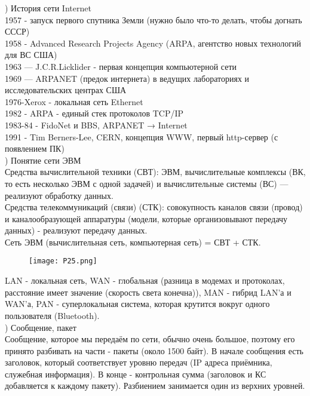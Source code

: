 ) История сети Internet \\
1957 - запуск первого спутника Земли (нужно было что-то делать, чтобы догнать СССР) \\
1958 - Advanced Research Projects Agency (ARPA, агентство новых технологий для ВС США)  \\
1963 — J.C.R.Licklider - первая концепция компьютерной сети \\
1969 — ARPANET (предок интернета) в ведущих лабораториях и исследовательских центрах США \\
1976-Xerox - локальная сеть Ethernet  \\
1982 - ARPA - единый стек протоколов TCP/IP \\ 
1983-84 - FidoNet и BBS, ARPANET → Internet \\
1991 - Tim Berners-Lee, CERN, концепция WWW, первый http-сервер (с появлением ПК) \\

) Понятие сети ЭВМ \\
Средства вычислительной техники (СВТ): ЭВМ, вычислительные комплексы (ВК, то есть несколько ЭВМ с одной задачей) и вычислительные системы (ВС) — реализуют обработку данных. \\
Средства телекоммуникаций (связи) (СТК): совокупность каналов связи (провод) и каналообразующей аппаратуры (модели, которые организовывают передачу данных) - реализуют передачу данных. \\
Сеть ЭВМ (вычислительная сеть, компьютерная сеть) = СВТ + СТК. 
\begin{figure}[H]
    \centering
    \texttt{[image: P25.png]}

\end{figure}
\noindent LAN - локальная сеть, WAN - глобальная (разница в модемах и протоколах, расстояние имеет значение (скорость света конечна)), MAN - гибрид LAN'а и WAN'а, PAN - суперлокальная система, которая крутится вокруг одного пользователя (Bluetooth). \\


) Сообщение, пакет \\
Сообщение, которое мы передаём по сети, обычно очень большое, поэтому его принято разбивать на части - пакеты (около 1500 байт). В начале сообщения есть заголовок, который соответствует уровню передач (IP адреса приёмника, служебная информация). В конце - контрольная сумма (заголовок и КС добавляется к каждому пакету). Разбиением занимается один из верхних уровней. \\

